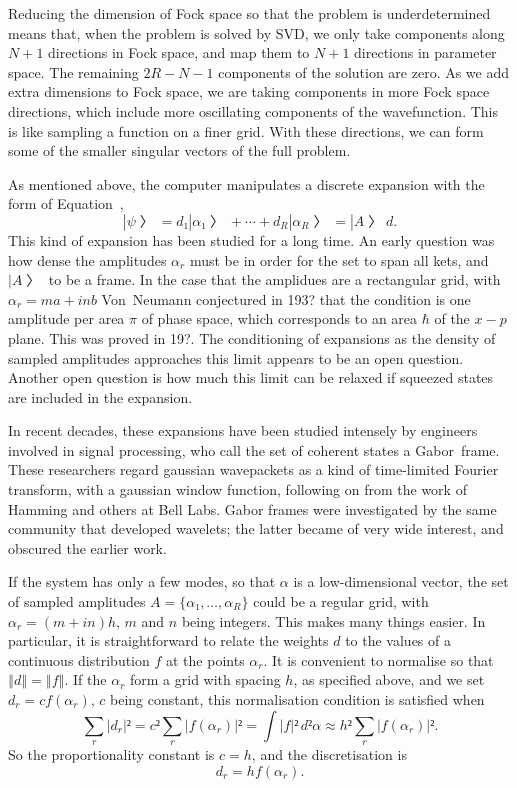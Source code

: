 
Reducing the dimension of Fock space so that the problem is underdetermined means that, when the problem is solved by SVD, we only take components along $N+1$ directions in Fock space, and map them to $N+1$ directions in parameter space.  The remaining $2R-N-1$ components of the solution are zero.  As we add extra dimensions to Fock space, we are taking components in more Fock space directions, which include more oscillating components of the wavefunction.  This is like sampling a function on a finer grid.  With these directions, we can form some of the smaller singular vectors of the full problem.


As mentioned above, the computer manipulates a discrete expansion with the form of Equation~\Ad,
$$|ψ〉=d₁|α₁〉+⋯+d_R|α_R〉=|A〉d.$$
This kind of expansion has been studied for a long time.  An early question was how dense the amplitudes $α_r$ must be in order for the set to span all kets, and $|A〉$ to be a frame.  In the case that the amplidues are a rectangular grid, with $α_r=ma+inb$ Von~Neumann conjectured in 193? that the condition is one amplitude per area $π$ of phase space, which corresponds to an area $\hbar$ of the $x-p$ plane.  This was proved in 19?.  The conditioning of expansions as the density of sampled amplitudes approaches this limit appears to be an open question.  Another open question is how much this limit can be relaxed if squeezed states are included in the expansion.

In recent decades, these expansions have been studied intensely by engineers involved in signal processing, who call the set of coherent states a Gabor~frame.  These researchers regard gaussian wavepackets as a kind of time-limited Fourier transform, with a gaussian window function, following on from the work of Hamming and others at Bell Labs.  Gabor frames were investigated by the same community that developed wavelets; the latter became of very wide interest, and obscured the earlier work.

If the system has only a few modes, so that $α$ is a low-dimensional vector, the set of sampled amplitudes $A=\{α₁, …,α_R\}$ could be a regular grid, with $α_r=(m+in)h$, $m$ and $n$ being integers.  This makes many things easier.  In particular, it is straightforward to relate the weights $d$ to the values of a continuous distribution $f$ at the points $α_r$.  It is convenient to normalise so that $‖d‖=‖f‖$.  If the $α_r$ form a grid with spacing $h$, as specified above, and we set $d_r=cf(α_r)$, $c$ being constant, this normalisation condition is satisfied when
$$∑_r|d_r|²=c²∑_r|f(α_r)|²=\int |f|²\,d²α≈h²∑_r|f(α_r)|².$$
So the proportionality constant is $c=h$, and the discretisation is
$$d_r=hf(α_r).$$

